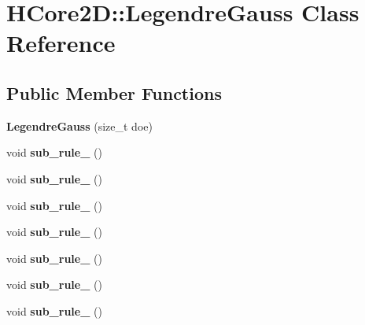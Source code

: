 \hypertarget{classHCore2D_1_1LegendreGauss}{}\section{H\+Core2D\+:\+:Legendre\+Gauss Class Reference}
\label{classHCore2D_1_1LegendreGauss}
\subsection*{Public Member Functions}
\begin{DoxyCompactItemize}
\item 
\mbox{\label{classHCore2D_1_1LegendreGauss_a4df4c78f50b0116cb68151073a45e08a}} 
{\bfseries Legendre\+Gauss} (size\+\_\+t doe)
\item 
\mbox{\label{classHCore2D_1_1LegendreGauss_aa60072df54f7acc9bad7362e4d6f6f72}} 
void {\bfseries sub\+\_\+rule\+\_} ()
\item 
\mbox{\label{classHCore2D_1_1LegendreGauss_a3b20f2cc13f96879fe731e3411e118cf}} 
void {\bfseries sub\+\_\+rule\+\_} ()
\item 
\mbox{\label{classHCore2D_1_1LegendreGauss_a0ee58d8688bfaaa7952cd7f70e06ad05}} 
void {\bfseries sub\+\_\+rule\+\_} ()
\item 
\mbox{\label{classHCore2D_1_1LegendreGauss_a55751cb4eed2cd44b12fe7bcc505097a}} 
void {\bfseries sub\+\_\+rule\+\_} ()
\item 
\mbox{\label{classHCore2D_1_1LegendreGauss_aa4e7cbaed5cea19a7490501e67bf728b}} 
void {\bfseries sub\+\_\+rule\+\_} ()
\item 
\mbox{\label{classHCore2D_1_1LegendreGauss_aff68078ed4cdc77372609b56c3fcfc2a}} 
void {\bfseries sub\+\_\+rule\+\_} ()
\item 
\mbox{\label{classHCore2D_1_1LegendreGauss_a70452a921cb1f1eb6e30d7436102ae01}} 
void {\bfseries sub\+\_\+rule\+\_} ()

\end{DoxyCompactItemize}
